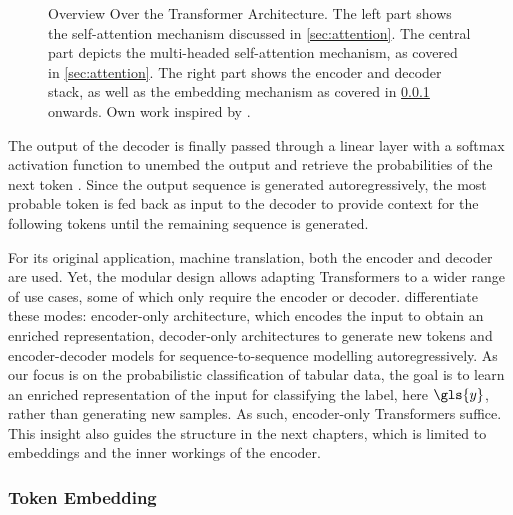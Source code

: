 \begin{landscape}
    \begin{figure}[ht]
        \centering
        {\renewcommand\normalsize{\scriptsize}%
            \normalsize
            }
        \caption[Overview Over the Transformer Architecture]{Overview Over the Transformer Architecture. The left part shows the self-attention mechanism discussed in \cref{sec:attention}. The central part depicts the multi-headed self-attention mechanism, as covered in \cref{sec:attention}. The right part shows the encoder and decoder stack, as well as the \gls{embedding} mechanism as covered in \cref{sec:token-embeddings} onwards. Own work inspired by \textcite[][3]{tayEfficientTransformersSurvey2022}.}
        \label{fig:transformer-architecture-overview}
    \end{figure}
\end{landscape}
The output of the decoder is finally passed through a linear layer with a softmax activation function to unembed the output and retrieve the probabilities of the next \gls{token} \autocite[][5]{vaswaniAttentionAllYou2017}. Since the output sequence is generated autoregressively, the most probable \gls{token} is fed back as input to the decoder to provide context for the following \glspl{token} until the remaining sequence is generated.

For its original application, machine translation, both the encoder and decoder are used. Yet, the modular design allows adapting Transformers to a wider range of use cases, some of which only require the encoder or decoder. \textcite[][16--17]{raffelExploringLimitsTransfer2020} differentiate these modes: encoder-only architecture, which encodes the input to obtain an enriched representation, decoder-only architectures to generate new \glspl{token} and encoder-decoder models for sequence-to-sequence modelling autoregressively. As our focus is on the probabilistic classification of tabular data, the goal is to learn an enriched representation of the input for classifying the label, here $\gls{y}$, rather than generating new samples. As such, encoder-only Transformers suffice. This insight also guides the structure in the next chapters, which is limited to \glspl{embedding} and the inner workings of the encoder.

\subsubsection{Token Embedding}\label{sec:token-embeddings}

